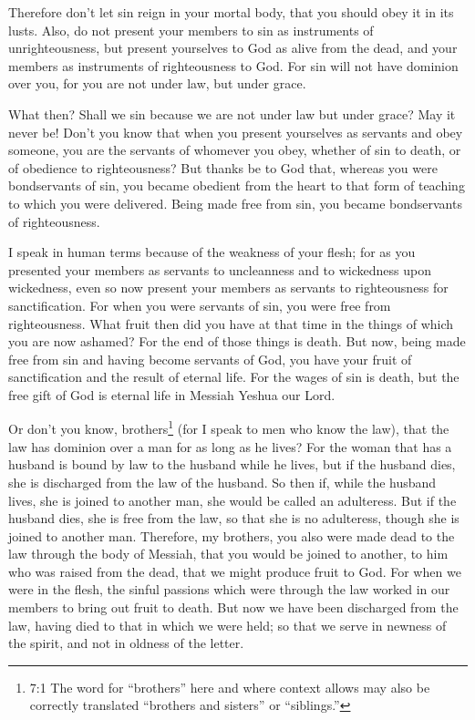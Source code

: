 \myverse{}Therefore don’t let sin reign in your mortal body, that you should
obey it in its lusts.
\myverse{}Also, do not present your members to sin as instruments of unrighteousness,
but present yourselves to God as alive from the dead, and your members as instruments of righteousness
to God.
\myverse{}For sin will not have dominion over you, for you are not under law, but under
grace.

\myverse{}What then? Shall we sin because we are not under law but under
grace? May it never be!
\myverse{}Don’t you know that when you present yourselves as servants and obey someone,
you are the servants of whomever you obey, whether of sin to death, or of obedience to righteousness?
\myverse{}But thanks be to God that, whereas you were bondservants of sin, you became
obedient from the heart to that form of teaching to which you were delivered.
\myverse{}Being made free from sin, you became bondservants of righteousness.

\myverse{}I speak in human terms because of the weakness of your flesh;
for as you presented your members as servants to uncleanness and to wickedness upon wickedness, even so
now present your members as servants to righteousness for sanctification.
\myverse{}For when you were servants of sin, you were free from righteousness.
\myverse{}What fruit then did you have at that time in the things of which you are now
ashamed? For the end of those things is death.
\myverse{}But now, being made free from sin and having become servants of God, you have
your fruit of sanctification and the result of eternal life.
\myverse{}For the wages of sin is death, but the free gift of God is eternal life in
Messiah Yeshua our Lord.


\mychapter{} \myverse*{}Or don’t you know, brothers\footnote{7:1 The word for “brothers” here and where context allows may also be correctly translated “brothers
	and sisters” or “siblings.”} (for I speak to men who know the law), that the law has dominion
over a man for as long as he lives?
\myverse{}For the woman that has a husband is bound by law to the husband while he lives,
but if the husband dies, she is discharged from the law of the husband.
\myverse{}So then if, while the husband lives, she is joined to another man, she would
be called an adulteress. But if the husband dies, she is free from the law, so that she is no adulteress,
though she is joined to another man.
\myverse{}Therefore, my brothers, you also were made dead to the law through the body
of Messiah, that you would be joined to another, to him who was raised from the dead, that we might produce
fruit to God.
\myverse{}For when we were in the flesh, the sinful passions which were through the law
worked in our members to bring out fruit to death.
\myverse{}But now we have been discharged from the law, having died to that in which we
were held; so that we serve in newness of the spirit, and not in oldness of the letter.

